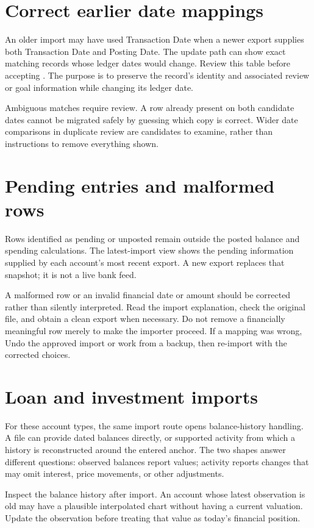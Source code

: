 \section{Correct earlier date mappings}
An older import may have used Transaction Date when a newer export supplies both Transaction Date and Posting Date. The update path can show exact matching records whose ledger dates would change. Review this table before accepting . The purpose is to preserve the record's identity and associated review or goal information while changing its ledger date.

Ambiguous matches require review. A row already present on both candidate dates cannot be migrated safely by guessing which copy is correct. Wider date comparisons in duplicate review are candidates to examine, rather than instructions to remove everything shown.

\section{Pending entries and malformed rows}
Rows identified as pending or unposted remain outside the posted balance and spending calculations. The latest-import view shows the pending information supplied by each account's most recent export. A new export replaces that snapshot; it is not a live bank feed.

A malformed row or an invalid financial date or amount should be corrected rather than silently interpreted. Read the import explanation, check the original file, and obtain a clean export when necessary. Do not remove a financially meaningful row merely to make the importer proceed. If a mapping was wrong, Undo the approved import or work from a backup, then re-import with the corrected choices.

\section{Loan and investment imports}
For these account types, the same import route opens balance-history handling. A file can provide dated balances directly, or supported activity from which a history is reconstructed around the entered anchor. The two shapes answer different questions: observed balances report values; activity reports changes that may omit interest, price movements, or other adjustments.

Inspect the balance history after import. An account whose latest observation is old may have a plausible interpolated chart without having a current valuation. Update the observation before treating that value as today's financial position.


